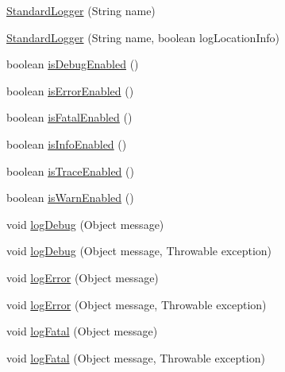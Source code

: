\begin{DoxyCompactItemize}
\item 
\mbox{\hyperlink{classcom_1_1mysql_1_1cj_1_1log_1_1_standard_logger_a9d62265f1433d6b78f2e9a90cc2ff756}{Standard\+Logger}} (String name)
\item 
\mbox{\hyperlink{classcom_1_1mysql_1_1cj_1_1log_1_1_standard_logger_afe35f964cf1fe918e883ed4d4f072fbc}{Standard\+Logger}} (String name, boolean log\+Location\+Info)
\item 
boolean \mbox{\hyperlink{classcom_1_1mysql_1_1cj_1_1log_1_1_standard_logger_ae2a40a552ba3dec4a358cecb436341a3}{is\+Debug\+Enabled}} ()
\item 
boolean \mbox{\hyperlink{classcom_1_1mysql_1_1cj_1_1log_1_1_standard_logger_ab2e1961de9eba2577b779cb970abc000}{is\+Error\+Enabled}} ()
\item 
boolean \mbox{\hyperlink{classcom_1_1mysql_1_1cj_1_1log_1_1_standard_logger_a622ab5114bddae2c0893a08e53c66cff}{is\+Fatal\+Enabled}} ()
\item 
boolean \mbox{\hyperlink{classcom_1_1mysql_1_1cj_1_1log_1_1_standard_logger_afa3c624bf9920c0131a8d0581c571ef8}{is\+Info\+Enabled}} ()
\item 
boolean \mbox{\hyperlink{classcom_1_1mysql_1_1cj_1_1log_1_1_standard_logger_afb271f7134e427754d35ae250b222f9e}{is\+Trace\+Enabled}} ()
\item 
boolean \mbox{\hyperlink{classcom_1_1mysql_1_1cj_1_1log_1_1_standard_logger_aad87d184634e72518bbc1a162fb06200}{is\+Warn\+Enabled}} ()
\item 
void \mbox{\hyperlink{classcom_1_1mysql_1_1cj_1_1log_1_1_standard_logger_a99571fed95c82bb8356f213c3a4b0fa8}{log\+Debug}} (Object message)
\item 
void \mbox{\hyperlink{classcom_1_1mysql_1_1cj_1_1log_1_1_standard_logger_a8f641c61351e0b4242bc14c49d72f603}{log\+Debug}} (Object message, Throwable exception)
\item 
void \mbox{\hyperlink{classcom_1_1mysql_1_1cj_1_1log_1_1_standard_logger_a190ac11ebc3b482ff9016af3e9a14ca4}{log\+Error}} (Object message)
\item 
void \mbox{\hyperlink{classcom_1_1mysql_1_1cj_1_1log_1_1_standard_logger_a536975e1d72a19baef92a859e27d2e7a}{log\+Error}} (Object message, Throwable exception)
\item 
void \mbox{\hyperlink{classcom_1_1mysql_1_1cj_1_1log_1_1_standard_logger_af6f7c3848e7c6df645dd52b95b312aaa}{log\+Fatal}} (Object message)
\item 
void \mbox{\hyperlink{classcom_1_1mysql_1_1cj_1_1log_1_1_standard_logger_a69e98cb3f558bb0403c602a83dbb515c}{log\+Fatal}} (Object message, Throwable exception)

\end{DoxyCompactItemize}
